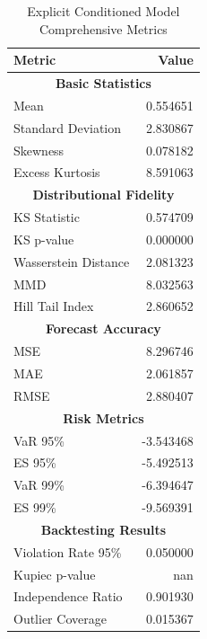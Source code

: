 \begin{table}[htbp]
\centering
\begin{tabular}{lr}
\hline
\textbf{Metric} & \textbf{Value} \\
\hline
\multicolumn{2}{c}{\textbf{Basic Statistics}} \\
\hline
Mean & 0.554651 \\
Standard Deviation & 2.830867 \\
Skewness & 0.078182 \\
Excess Kurtosis & 8.591063 \\
\hline
\multicolumn{2}{c}{\textbf{Distributional Fidelity}} \\
\hline
KS Statistic & 0.574709 \\
KS p-value & 0.000000 \\
Wasserstein Distance & 2.081323 \\
MMD & 8.032563 \\
Hill Tail Index & 2.860652 \\
\hline
\multicolumn{2}{c}{\textbf{Forecast Accuracy}} \\
\hline
MSE & 8.296746 \\
MAE & 2.061857 \\
RMSE & 2.880407 \\
\hline
\multicolumn{2}{c}{\textbf{Risk Metrics}} \\
\hline
VaR 95\% & -3.543468 \\
ES 95\% & -5.492513 \\
VaR 99\% & -6.394647 \\
ES 99\% & -9.569391 \\
\hline
\multicolumn{2}{c}{\textbf{Backtesting Results}} \\
\hline
Violation Rate 95\% & 0.050000 \\
Kupiec p-value & nan \\
Independence Ratio & 0.901930 \\
Outlier Coverage & 0.015367 \\
\hline
\end{tabular}
\caption{Explicit Conditioned Model Comprehensive Metrics}
\label{tab:explicit_conditioned_comprehensive_metrics}
\end{table}
